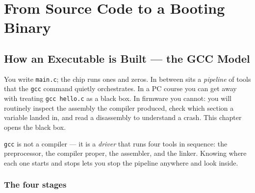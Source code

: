 \documentclass[11pt,a4paper,oneside]{book}
\newcommand{\code}[1]{\texttt{#1}}
\begin{document}
\part{From Source Code to a Booting Binary}

\chapter{How an Executable is Built --- the GCC Model}
\label{ch:gcc-model}

You write \code{main.c}; the chip runs ones and zeros. In between sits a
\emph{pipeline} of tools that the \code{gcc} command quietly orchestrates. In a
PC course you can get away with treating \code{gcc hello.c} as a black box. In
firmware you cannot: you will routinely inspect the assembly the compiler
produced, check which section a variable landed in, and read a disassembly to
understand a crash. This chapter opens the black box.

\begin{keyidea}
\code{gcc} is not a compiler --- it is a \emph{driver} that runs four tools in
sequence: the preprocessor, the compiler proper, the assembler, and the linker.
Knowing where each one starts and stops lets you stop the pipeline anywhere and
look inside.
\end{keyidea}

\section{The four stages}
\end{document}
